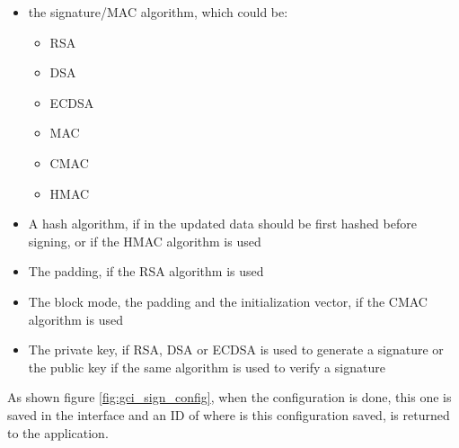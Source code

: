 \begin{itemize}
  \item the signature/MAC algorithm, which could be:
  \begin{itemize}
    \item RSA
    \item DSA
    \item ECDSA
    \item MAC
    \item CMAC
    \item HMAC
  \end{itemize}
  \item A hash algorithm, if in the updated data should be first hashed before
  signing, or if the HMAC algorithm is used
  \item The padding, if the RSA algorithm is used
  \item The block mode, the padding and the initialization vector, if the CMAC
  algorithm is used
  \item The private key, if RSA, DSA or ECDSA is used to generate a signature or
  the public key if the same algorithm is used to verify a signature
\end{itemize}
As shown figure \ref{fig:gci_sign_config}, when the configuration is done, this
one is saved in the interface and an ID of where is this configuration saved, is
returned to the application.\newline
